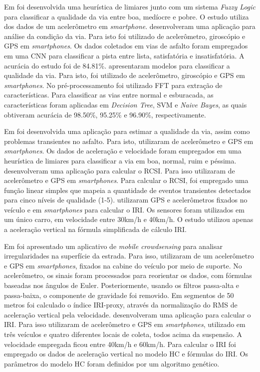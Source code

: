 Em \cite{Badurowicz2020} foi desenvolvida uma heurística de limiares junto com um sistema \textit{Fuzzy Logic} para classificar a qualidade da via entre boa, medíocre e pobre. O estudo utiliza dos dados de um acelerômetro em \textit{smartphone}. \cite{Leizerovych2020} desenvolveram uma aplicação para análise da condição da via. Para isto foi utilizado de acelerômetro, giroscópio e GPS em \textit{smartphones}. Os dados coletados em vias de asfalto foram empregados em uma CNN para classificar a pista entre lista, satisfatória e insatisfatória. A acurácia do estudo foi de 84.81\%. \cite{Allouch2017} apresentaram modelos para classificar a qualidade da via. Para isto, foi utilizado de acelerômetro, giroscópio e GPS em \textit{smartphones}. No pré-processamento foi utilizado FFT para extração de características. Para classificar as vias entre normal e esburacada, as características foram aplicadas em \textit{Decision Tree}, SVM e \textit{Naive Bayes}, as quais obtiveram acurácia de 98.50\%, 95.25\% e 96.90\%, respectivamente.

Em \cite{Lima2016}  foi desenvolvida uma aplicação para estimar a qualidade da via, assim como problemas transientes no asfalto. Para isto, utilizaram de acelerômetro e GPS em \textit{smartphones}. Os dados de aceleração e velocidade foram empregados em uma heurística de limiares para classificar a via em boa, normal, ruim e péssima.
\cite{Brunauer2016} desenvolveram uma aplicação para calcular o RCSI. Para isso utilizaram de acelerômetro e GPS em \textit{smartphones}. Para calcular o RCSI, foi empregado uma função linear simples que mapeia a quantidade de eventos transientes detectados para cinco níveis de qualidade (1-5). \cite{AbdelRaheem2020} utilizaram GPS e acelerômetros fixados no veículo e em \textit{smartphones} para calcular o IRI. Os sensores foram utilizados em um único carro, em velocidade entre 30km/h e 40km/h. O estudo utilizou apenas a aceleração vertical na fórmula simplificada de cálculo IRI. 

Em \cite{Li2018} foi apresentado um aplicativo de \textit{mobile crowdsensing} para analisar irregularidades na superfície da estrada. Para isso, utilizaram de um acelerômetro e GPS em \textit{smartphones}, fixados na cabine do veículo por meio de suporte. No acelerômetro, os sinais foram processados para reorientar os dados, com fórmulas baseadas nos ângulos de Euler. Posteriormente, usando os filtros passa-alta e passa-baixa, o componente de gravidade foi removido. Em segmentos de 50 metros foi calculado o índice IRI-proxy, através da normalização do RMS de aceleração vertical pela velocidade. \cite{Zhao2016} desenvolveram uma aplicação para calcular o IRI. Para isso utilizaram de acelerômetro e GPS em \textit{smartphones}, utilizado em três veículos e quatro diferentes locais de coleta, todos acima da suspensão. A velocidade empregada ficou entre 40km/h e 60km/h. Para calcular o IRI foi empregado os dados de aceleração vertical no modelo HC e fórmulas do IRI. Os parâmetros do modelo HC foram definidos por um algoritmo genético.

